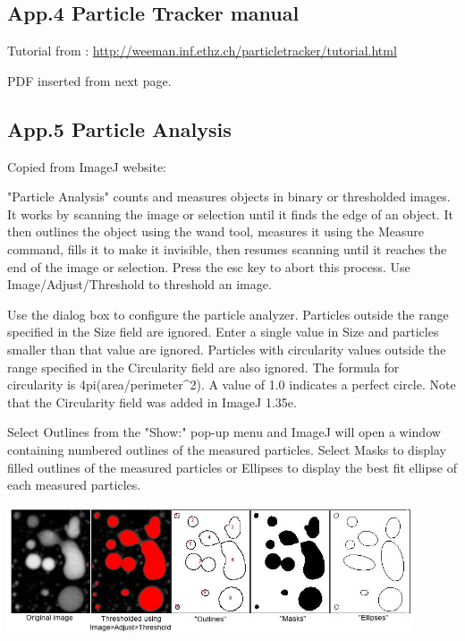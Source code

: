 \clearpage

\subsection{App.4 Particle Tracker manual}
\label{app4}

Tutorial from : \url{http://weeman.inf.ethz.ch/particletracker/tutorial.html}

PDF inserted from next page. 



\clearpage
\subsection{App.5 Particle Analysis}
\label{app5}
Copied from ImageJ website:

"Particle Analysis" counts and measures
objects in binary or thresholded images. It works by scanning the image
or selection until it finds the edge of an object. It then outlines the
object using the wand tool, measures it using the Measure command,
fills it to make it invisible, then resumes scanning until it reaches
the end of the image or selection. Press the esc key to abort this
process. Use Image/Adjust/Threshold to threshold an image.



Use the dialog box to configure the particle analyzer. Particles outside
the range specified in the Size field are ignored. Enter a single value
in Size and particles smaller than that value are ignored. Particles
with circularity values outside the range specified in the Circularity
field are also ignored. The formula for circularity is
4pi(area/perimeter\^{}2). A value of 1.0 indicates a perfect circle.
Note that the Circularity field was added in ImageJ 1.35e.

Select Outlines from the "Show:" pop-up menu
and ImageJ will open a window containing numbered outlines of the
measured particles. Select Masks to display filled outlines of the
measured particles or Ellipses to display the best fit ellipse of each
measured particles.

\includegraphics[width=12cm]{img/CMCIBasicCourse201102-img169.jpg}

